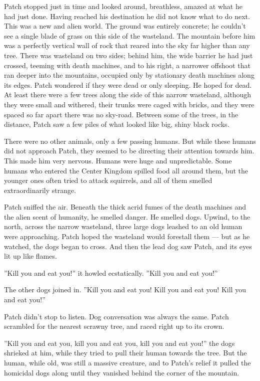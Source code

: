 \documentclass[12pt]{book}
\begin{document}
Patch stopped just in time and looked around, breathless, amazed at what he had just done. Having reached his destination he did not know what to do next. This was a new and alien world. The ground was entirely concrete; he couldn't see a single blade of grass on this side of the wasteland. The mountain before him was a perfectly vertical wall of rock that reared into the sky far higher than any tree. There was wasteland on two sides; behind him, the wide barrier he had just crossed, teeming with death machines, and to his right, a narrower offshoot that ran deeper into the mountains, occupied only by stationary death machines along its edges. Patch wondered if they were dead or only sleeping. He hoped for dead. At least there were a few trees along the side of this narrow wasteland, although they were small and withered, their trunks were caged with bricks, and they were spaced so far apart there was no sky-road. Between some of the trees, in the distance, Patch saw a few piles of what looked like big, shiny black rocks.

There were no other animals, only a few passing humans. But while these humans did not approach Patch, they seemed to be directing their attention towards him. This made him very nervous. Humans were huge and unpredictable. Some humans who entered the Center Kingdom spilled food all around them, but the younger ones often tried to attack squirrels, and all of them smelled extraordinarily strange.

Patch sniffed the air. Beneath the thick acrid fumes of the death machines and the alien scent of humanity, he smelled danger. He smelled dogs. Upwind, to the north, across the narrow wasteland, three large dogs leashed to an old human were approaching. Patch hoped the wasteland would forestall them ---
but as he watched, the dogs began to cross. And then the lead dog saw Patch, and its eyes lit up like flames.

''Kill you and eat you!'' it howled ecstatically. ''Kill you and eat you!''

The other dogs joined in. ''Kill you and eat you! Kill you and eat you! Kill you and eat you!''

Patch didn't stop to listen. Dog conversation was always the same. Patch scrambled for the nearest scrawny tree, and raced right up to its crown.

''Kill you and eat you, kill you and eat you, kill you and eat you!'' the dogs shrieked at him, while they tried to pull their human towards the tree. But the human, while old, was still a massive creature, and to Patch's relief it pulled the homicidal dogs along until they vanished behind the corner of the mountain.
\end{document}
